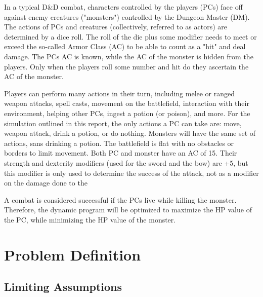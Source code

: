 \documentclass[letterpaper, 10 pt, conference]{ieeeconf}
\begin{document}
In a typical D\&D combat, characters controlled by the players (PCs) face off against enemy creatures ("monsters") controlled by the Dungeon Master (DM). The actions of PCs and creatures (collectively,
referred to as actors) are determined by a dice roll. The roll of the die plus some modifier needs to meet or exceed the so-called Armor Class (AC) to be able to count as a "hit"
and deal damage. The PCs AC is known, while the AC of the monster is hidden from the players. Only when the players roll some number and hit do they ascertain the AC of the monster.

Players can perform many actions in their turn, including melee or ranged weapon attacks, spell casts, movement on the battlefield, interaction with their environment, helping other
PCs, ingest a potion (or poison), and more. For the simulation outlined in this report, the only actions a PC can take are: move, weapon attack, drink a potion, or do nothing. Monsters 
will have the same set of actions, sans drinking a potion. The battlefield is flat with no obstacles or borders to limit movement. Both PC and monster have an AC of 15. Their strength and dexterity modifiers (used
for the sword and the bow) are +5, but this modifier is only used to determine the success of the attack, not as a modifier on the damage done to the

A combat is considered successful if the PCs live while killing the monster. Therefore, the dynamic program will be optimized to maximize the HP value of the PC, while minimizing the HP
value of the monster. 

\section{Problem Definition}\label{sec:pblm_def}
\subsection{Limiting Assumptions}
\end{document}
